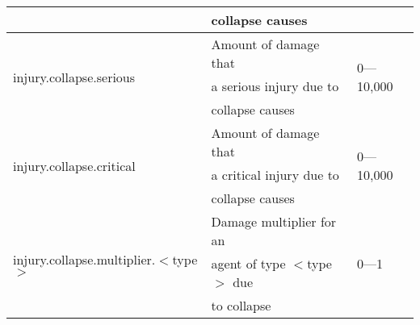 \documentclass{article}
\begin{document}
\begin{table}[htb]
\begin{tabular}{lll}
                                                                & collapse
  causes                                & \\
  \hline
  \multirow{3}{*}{injury.collapse.serious}                      & Amount of
  damage that                           & \multirow{3}{*}{0---10,000}\\
                                                                & a serious
  injury due to                         & \\
                                                                & collapse
  causes                                & \\
  \hline
  \multirow{3}{*}{injury.collapse.critical}                     & Amount of
  damage that                           & \multirow{3}{*}{0---10,000}\\
                                                                & a critical
  injury due to                         & \\
                                                                & collapse
  causes & \\
  \hline
  \multirow{3}{*}{injury.collapse.multiplier.$<$type$>$}        & Damage
  multiplier for an                     & \multirow{3}{*}{0---1}\\
                                                                & agent of type
  $<$type$>$ due                        & \\
                                                                & to collapse  
                                        & \\
  \hline
\end{tabular}
\end{table}
\end{document}
